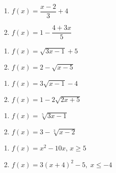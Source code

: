 \begin{multicols}{2}
\begin{enumerate}
\setcounter{enumi}{\value{HW}}

\item $f(x) = \dfrac{x-2}{3} + 4$
\item $f(x)  = 1 - \dfrac{4+3x}{5}$


\setcounter{HW}{\value{enumi}}
\end{enumerate}
\end{multicols}


\begin{multicols}{2}
\begin{enumerate}
\setcounter{enumi}{\value{HW}}

\item $f(x) = \sqrt{3x-1}+5$
\item $f(x) = 2-\sqrt{x - 5}$

\setcounter{HW}{\value{enumi}}
\end{enumerate}
\end{multicols}

\begin{multicols}{2}
\begin{enumerate}
\setcounter{enumi}{\value{HW}}

\item $f(x) = 3\sqrt{x-1}-4$
\item $f(x) = 1 - 2\sqrt{2x+5}$


\setcounter{HW}{\value{enumi}}
\end{enumerate}
\end{multicols}

\begin{multicols}{2}
\begin{enumerate}
\setcounter{enumi}{\value{HW}}

\item $f(x) = \sqrt[5]{3x-1}$
\item $f(x) = 3-\sqrt[3]{x-2}$

\setcounter{HW}{\value{enumi}}
\end{enumerate}
\end{multicols}

\begin{multicols}{2}
\begin{enumerate}
\setcounter{enumi}{\value{HW}}

\item $f(x) = x^2 - 10x$, $x \geq 5$
\item $f(x) = 3(x + 4)^{2} - 5, \; x \leq -4$

\setcounter{HW}{\value{enumi}}
\end{enumerate}
\end{multicols}


